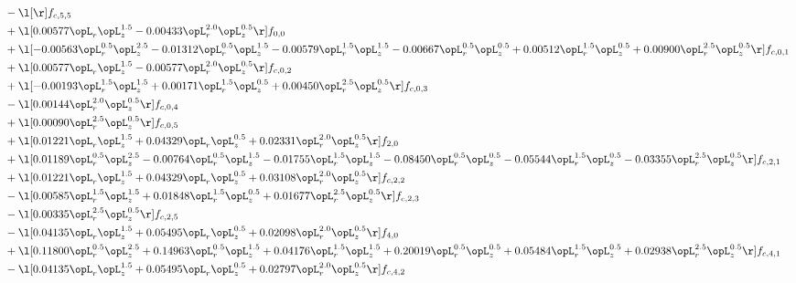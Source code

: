 \begin{alignat}{2}
& - \l[  \r] f_{c,5,5} \nonumber \\ 
& + \l[  0.00577 \opL_r \opL_z^{1.5}   -0.00433 \opL_r^{2.0} \opL_z^{0.5}  \r] f_{0,0} \nonumber \\ 
& + \l[  -0.00563 \opL_r^{0.5} \opL_z^{2.5}   -0.01312 \opL_r^{0.5} \opL_z^{1.5}   -0.00579 \opL_r^{1.5} \opL_z^{1.5}   -0.00667 \opL_r^{0.5} \opL_z^{0.5} +  0.00512 \opL_r^{1.5} \opL_z^{0.5} +  0.00900 \opL_r^{2.5} \opL_z^{0.5}  \r] f_{c,0,1} \nonumber \\ 
& + \l[  0.00577 \opL_r \opL_z^{1.5}   -0.00577 \opL_r^{2.0} \opL_z^{0.5}  \r] f_{c,0,2} \nonumber \\ 
& + \l[  -0.00193 \opL_r^{1.5} \opL_z^{1.5} +  0.00171 \opL_r^{1.5} \opL_z^{0.5} +  0.00450 \opL_r^{2.5} \opL_z^{0.5}  \r] f_{c,0,3} \nonumber \\ 
& - \l[  0.00144 \opL_r^{2.0} \opL_z^{0.5}  \r] f_{c,0,4} \nonumber \\ 
& + \l[  0.00090 \opL_r^{2.5} \opL_z^{0.5}  \r] f_{c,0,5} \nonumber \\ 
& + \l[  0.01221 \opL_r \opL_z^{1.5} +  0.04329 \opL_r \opL_z^{0.5} +  0.02331 \opL_r^{2.0} \opL_z^{0.5}  \r] f_{2,0} \nonumber \\ 
& + \l[  0.01189 \opL_r^{0.5} \opL_z^{2.5}   -0.00764 \opL_r^{0.5} \opL_z^{1.5}   -0.01755 \opL_r^{1.5} \opL_z^{1.5}   -0.08450 \opL_r^{0.5} \opL_z^{0.5}   -0.05544 \opL_r^{1.5} \opL_z^{0.5}   -0.03355 \opL_r^{2.5} \opL_z^{0.5}  \r] f_{c,2,1} \nonumber \\ 
& + \l[  0.01221 \opL_r \opL_z^{1.5} +  0.04329 \opL_r \opL_z^{0.5} +  0.03108 \opL_r^{2.0} \opL_z^{0.5}  \r] f_{c,2,2} \nonumber \\ 
& - \l[  0.00585 \opL_r^{1.5} \opL_z^{1.5} +  0.01848 \opL_r^{1.5} \opL_z^{0.5} +  0.01677 \opL_r^{2.5} \opL_z^{0.5}  \r] f_{c,2,3} \nonumber \\ 
& - \l[  0.00335 \opL_r^{2.5} \opL_z^{0.5}  \r] f_{c,2,5} \nonumber \\ 
& - \l[  0.04135 \opL_r \opL_z^{1.5} +  0.05495 \opL_r \opL_z^{0.5} +  0.02098 \opL_r^{2.0} \opL_z^{0.5}  \r] f_{4,0} \nonumber \\ 
& + \l[  0.11800 \opL_r^{0.5} \opL_z^{2.5} +  0.14963 \opL_r^{0.5} \opL_z^{1.5} +  0.04176 \opL_r^{1.5} \opL_z^{1.5} +  0.20019 \opL_r^{0.5} \opL_z^{0.5} +  0.05484 \opL_r^{1.5} \opL_z^{0.5} +  0.02938 \opL_r^{2.5} \opL_z^{0.5}  \r] f_{c,4,1} \nonumber \\ 
& - \l[  0.04135 \opL_r \opL_z^{1.5} +  0.05495 \opL_r \opL_z^{0.5} +  0.02797 \opL_r^{2.0} \opL_z^{0.5}  \r] f_{c,4,2} \nonumber \\ 

\end{alignat}
